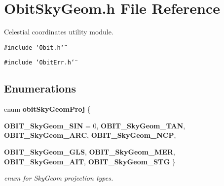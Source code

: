 \section{Obit\-Sky\-Geom.h File Reference}
\label{ObitSkyGeom_8h}
Celestial coordinates utility module. 

{\tt \#include \char`\"{}Obit.h\char`\"{}}\par
{\tt \#include \char`\"{}Obit\-Err.h\char`\"{}}\par
\subsection*{Enumerations}
\begin{CompactItemize}
\item 
enum {\bf obit\-Sky\-Geom\-Proj} \{ \par
{\bf OBIT\_\-Sky\-Geom\_\-SIN} =  0, 
{\bf OBIT\_\-Sky\-Geom\_\-TAN}, 
{\bf OBIT\_\-Sky\-Geom\_\-ARC}, 
{\bf OBIT\_\-Sky\-Geom\_\-NCP}, 
\par
{\bf OBIT\_\-Sky\-Geom\_\-GLS}, 
{\bf OBIT\_\-Sky\-Geom\_\-MER}, 
{\bf OBIT\_\-Sky\-Geom\_\-AIT}, 
{\bf OBIT\_\-Sky\-Geom\_\-STG}
 \}
\begin{CompactList}\small\item\em enum for Sky\-Geom projection types. \item\end{CompactList}\end{CompactItemize}
